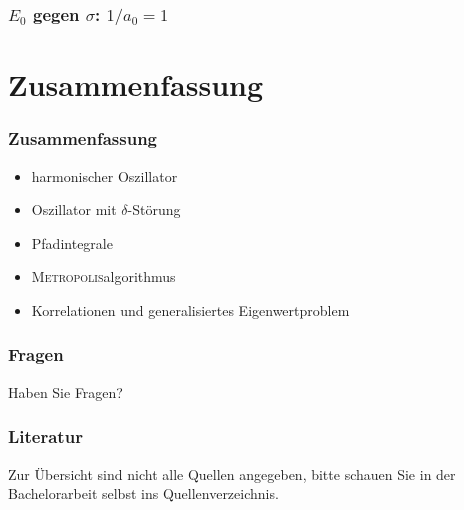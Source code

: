 \documentclass[ngerman, fleqn]{beamer}
\newcommand\gausswidth{\sigma}
\newcommand\timestep{a}
\begin{document}
\begin{frame}
    \frametitle{$E_0$ gegen $\gausswidth$: $1/a_0 = \num{+1}$}

\end{frame}

\section*{Zusammenfassung}

\begin{frame}
    \frametitle{Zusammenfassung}

    \begin{itemize}
        \item
            harmonischer Oszillator
        \item
            Oszillator mit $\delta$-Störung
        \item
            Pfadintegrale
        \item
            \textsc{Metropolis}algorithmus
        \item
            Korrelationen und generalisiertes Eigenwertproblem
    \end{itemize}
\end{frame}

\begin{frame}
    \frametitle{Fragen}

    Haben Sie Fragen?
\end{frame}

\begin{frame}
    \frametitle{Literatur}

    \printbibliography

    \begin{small}
    Zur Übersicht sind nicht alle Quellen angegeben, bitte schauen Sie in der
    Bachelorarbeit selbst ins Quellenverzeichnis.
    \end{small}
\end{frame}
\end{document}
